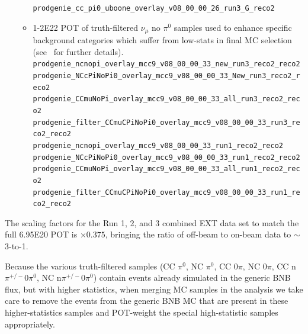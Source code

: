 \begin{itemize}
\begin{itemize}
\texttt{prodgenie\_cc\_pi0\_uboone\_overlay\_v08\_00\_00\_26\_run3\_G\_reco2}\newline
\item 1-2E22 POT of truth-filtered $\nu_{\mu}$ no $\pi^0$ samples used to enhance specific background categories which suffer from low-stats in final MC selection (see~\cite{bib:truthfilters} for further details). \newline
\texttt{prodgenie\_ncnopi\_overlay\_mcc9\_v08\_00\_00\_33\_new\_run3\_reco2\_reco2}\newline
\texttt{prodgenie\_NCcPiNoPi0\_overlay\_mcc9\_v08\_00\_00\_33\_New\_run3\_reco2\_reco2}\newline
\texttt{prodgenie\_CCmuNoPi\_overlay\_mcc9\_v08\_00\_00\_33\_all\_run3\_reco2\_reco2}\newline
\texttt{prodgenie\_filter\_CCmuCPiNoPi0\_overlay\_mcc9\_v08\_00\_00\_33\_run3\_reco2\_reco2}\newline
\texttt{prodgenie\_ncnopi\_overlay\_mcc9\_v08\_00\_00\_33\_run1\_reco2\_reco2}\newline
\texttt{prodgenie\_NCcPiNoPi0\_overlay\_mcc9\_v08\_00\_00\_33\_run1\_reco2\_reco2}\newline
\texttt{prodgenie\_CCmuNoPi\_overlay\_mcc9\_v08\_00\_00\_33\_all\_run1\_reco2\_reco2}\newline
\texttt{prodgenie\_filter\_CCmuCPiNoPi0\_overlay\_mcc9\_v08\_00\_00\_33\_run1\_reco2\_reco2}
\end{itemize}
\end{itemize}


The scaling factors for the Run 1, 2, and 3 combined EXT data set to match the full 6.95E20 POT is $\times0.375$, bringing the ratio of off-beam to on-beam data to $\sim$3-to-1. %
\par Because the various truth-filtered samples (CC $\pi^0$, NC $\pi^0$, CC 0$\pi$, NC 0$\pi$, CC n$\pi^{+/-}$0$\pi^0$, NC n$\pi^{+/-}$0$\pi^0$) contain events already simulated in the generic BNB flux, but with higher statistics, when merging MC samples in the analysis we take care to remove the events from the generic BNB MC that are present in these higher-statistics samples and POT-weight the special high-statistic samples appropriately. 

